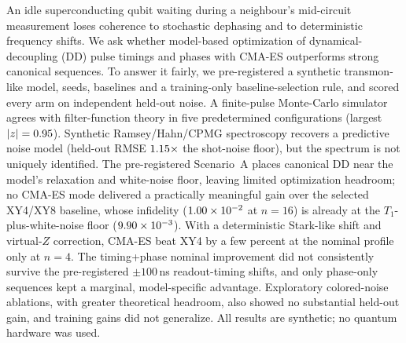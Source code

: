 An idle superconducting qubit waiting during a neighbour's mid-circuit measurement loses
coherence to stochastic dephasing and to deterministic frequency shifts. We ask whether
model-based optimization of dynamical-decoupling (DD) pulse timings and phases with CMA-ES
outperforms strong canonical sequences. To answer it fairly, we pre-registered a synthetic
transmon-like model, seeds, baselines and a training-only baseline-selection rule, and scored
every arm on independent held-out noise. A finite-pulse Monte-Carlo simulator agrees with
filter-function theory in five predetermined configurations (largest $|z|=0.95$).
Synthetic Ramsey/Hahn/CPMG spectroscopy recovers a predictive noise model (held-out RMSE
$1.15\times$ the shot-noise floor), but the spectrum is not uniquely
identified. The pre-registered Scenario~A places canonical DD near the model's relaxation
and white-noise floor, leaving limited optimization headroom; no CMA-ES mode
delivered a practically meaningful gain over the selected XY4/XY8 baseline,
whose infidelity ($1.00\times10^{-2}$ at $n=16$) is already at the $T_1$-plus-white-noise
floor ($9.90\times10^{-3}$). With a deterministic Stark-like shift and virtual-$Z$ correction, CMA-ES
beat XY4 by a few percent at the nominal profile only at $n=4$. The timing+phase nominal improvement did not consistently survive the
pre-registered $\pm100$\,ns readout-timing shifts, and only phase-only
sequences kept a marginal, model-specific advantage. Exploratory colored-noise ablations, with greater theoretical
headroom, also showed no substantial held-out gain, and training gains did not generalize. All results are synthetic; no quantum hardware was used.
